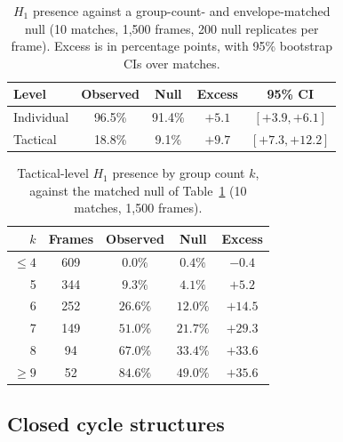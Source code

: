 \begin{table}[h]
\centering
\caption{\texorpdfstring{$H_1$}{} presence against a group-count- and envelope-matched null (10 matches, 1{,}500 frames, 200 null replicates per frame). Excess is in percentage points, with 95\% bootstrap CIs over matches.}
\label{tab:null}
\begin{tabular}{@{}lcccc@{}}
\toprule
Level & Observed & Null & Excess & 95\% CI \\
\midrule
Individual & 96.5\% & 91.4\% & $+5.1$ & $[+3.9, +6.1]$ \\
Tactical   & 18.8\% & 9.1\%  & $+9.7$ & $[+7.3, +12.2]$ \\
\bottomrule
\end{tabular}
\end{table}

\begin{table}[h]
\centering
\caption{Tactical-level \texorpdfstring{$H_1$}{} presence by group count \texorpdfstring{$k$}{}, against the matched null of Table~\ref{tab:null} (10 matches, 1{,}500 frames).}
\label{tab:nullk}
\begin{tabular}{@{}rcccc@{}}
\toprule
$k$ & Frames & Observed & Null & Excess \\
\midrule
$\le 4$ & 609 & $0.0\%$ & $0.4\%$ & $-0.4$ \\
5 & 344 & $9.3\%$ & $4.1\%$ & $+5.2$ \\
6 & 252 & $26.6\%$ & $12.0\%$ & $+14.5$ \\
7 & 149 & $51.0\%$ & $21.7\%$ & $+29.3$ \\
8 & 94 & $67.0\%$ & $33.4\%$ & $+33.6$ \\
$\ge 9$ & 52 & $84.6\%$ & $49.0\%$ & $+35.6$ \\
\bottomrule
\end{tabular}
\end{table}

\subsection{Closed cycle structures}
\label{sec:cyclegeometry}


